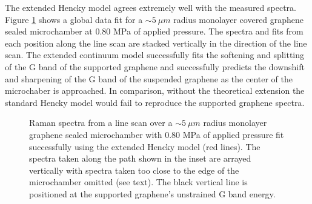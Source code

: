 The extended Hencky model agrees extremely well with the measured spectra.
Figure \ref{fig:fri:fitlinescan} shows a global data fit for a $\sim 5 \ \mu m$ radius monolayer covered graphene sealed microchamber at 0.80 MPa of applied pressure.
The spectra and fits from each position along the line scan are stacked vertically in the direction of the line scan.
The extended continuum model successfully fits the softening and splitting of the G band of the supported graphene and successfully predicts the downshift and sharpening of the G band of the suspended graphene as the center of the microchaber is approached.
In comparison, without the theoretical extension the standard Hencky model would fail to reproduce the supported graphene spectra.

\begin{figure}
	\begin{center}
	
	\end{center}
	\caption[Fit line scan spectra]{\label{fig:fri:fitlinescan} 
	Raman spectra from a line scan over a $\sim 5 \ \mu m$ radius monolayer graphene sealed microchamber with 0.80 MPa of applied pressure fit successfully using the extended Hencky model (red lines).
	The spectra taken along the path shown in the inset are arrayed vertically with spectra taken too close to the edge of the microchamber omitted (see text).
	The black vertical line is positioned at the supported graphene's unstrained G band energy.}
\end{figure}


